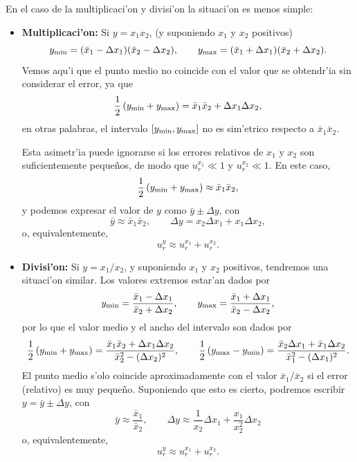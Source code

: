 \documentclass[letterpaper,11pt]{report}
\begin{document}
En el caso de la multiplicaci'on y divisi'on la situaci'on es menos simple:
\begin{itemize}
\item \textbf{Multiplicaci'on:} Si $y=x_1 x_2$, (y suponiendo $x_1$ y $x_2$ positivos)
\begin{equation}
y_{\rm min} = (\bar{x}_1-\Delta x_1)(\bar{x}_2-\Delta x_2), \qquad 
y_{\rm max} = (\bar{x}_1+\Delta x_1)(\bar{x}_2+\Delta x_2).
\end{equation}
Vemos aqu'i que el punto medio no coincide con el valor que se obtendr'ia sin considerar el error, ya que
\begin{equation}
\frac{1}{2}\left(y_{\rm min}+y_{\rm max}\right) = \bar{x}_1\bar{x}_2+\Delta x_1\Delta x_2,
\end{equation}
en otras palabras, el intervalo $[y_{\rm min},y_{\rm max}]$ no es sim'etrico respecto a $\bar{x}_1\bar{x}_2$.

Esta asimetr'ia puede ignorarse si los errores relativos de $x_1$ y $x_2$ son suficientemente peque\~nos, de modo que $u_r^{x_1}\ll 1$ y $u_r^{x_2}\ll 1$. En este caso,
\begin{equation}
\frac{1}{2}\left(y_{\rm min}+y_{\rm max}\right) \approx \bar{x}_1\bar{x}_2,
\end{equation}
y podemos expresar el valor de $y$ como $\bar{y}\pm\Delta y$, con
\begin{equation}
\bar{y} \approx \bar{x}_1\bar{x}_2, \qquad  \Delta y= x_2\Delta x_1 + x_1\Delta x_2 , 
\end{equation}
o, equivalentemente,
\begin{equation}
u_r^{y} \approx u_r^{x_1} + u_r^{x_2}.
\end{equation}

\item \textbf{Divisi'on:} Si $y=x_1/x_2$, y suponiendo $x_1$ y $x_2$ positivos, tendremos una situaci'on similar. Los valores extremos estar'an dados por
\begin{equation}
y_{\rm min} = \frac{\bar{x}_1-\Delta x_1}{\bar{x}_2+\Delta x_2}, \qquad 
y_{\rm max} = \frac{\bar{x}_1+\Delta x_1}{\bar{x}_2-\Delta x_2},
\end{equation}
por lo que el valor medio y el ancho del intervalo son dados por
\begin{equation}
\frac{1}{2}\left(y_{\rm min}+y_{\rm max}\right) = \frac{\bar{x}_1\bar{x}_2+\Delta x_1\Delta x_2}{\bar{x}_2^2-(\Delta x_2)^2}, 
\qquad \frac{1}{2}\left(y_{\rm max}-y_{\rm min}\right) = \frac{\bar{x}_2\Delta x_1 + \bar{x}_1\Delta x_2}{\bar{x}_1^2-(\Delta x_1)^2}.
\end{equation}
El punto medio s'olo coincide aproximadamente con el valor $\bar{x}_1/\bar{x}_2$ si el error (relativo) es muy peque\~no. Suponiendo que esto es cierto, podremos escribir $y = \bar{y}\pm\Delta y$, con
\begin{equation}
\bar{y}\approx \frac{\bar{x}_1}{\bar{x}_2}, \qquad  \Delta y \approx \frac{1}{x_2}\Delta x_1 + \frac{x_1}{x_2^2}\Delta x_2
\end{equation}
o, equivalentemente,
\begin{equation}
u_r^{y} \approx  u_r^{x_1} + u_r^{x_2}.
\end{equation}


\end{itemize}
\end{document}
